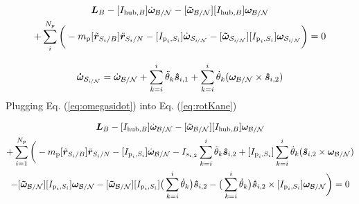 \documentclass[paper]{aiaaNew}
\begin{document}
\begin{multline}
\bm L_B -[I_{\text{hub},B}] \dot{\bm\omega}_{\cal B/N}  -[\bm{\tilde{\omega}}_{\cal B/N}] [I_{\text{hub},B}] \bm\omega_{\cal B/N}\\ + \sum\limits_{i}^{N_p}\bigg(- m_{\text{p}} [\tilde{{\bm r}}_{S_{i}/B}] \ddot{\bm r}_{S_{i}/N} -[I_{\text{p}_i,S_i}] \dot{\bm\omega}_{\cal S_{\textit{i}/N}}  -[\bm{\tilde{\omega}}_{\cal S_{\textit{i}/N}}] [I_{\text{p}_i,S_i}] \bm\omega_{\cal S_{\textit{i}/N}}\bigg) = 0
\label{eq:rotKane}
\end{multline}

\begin{equation}
\bm{\dot{\omega}}_{\cal S_{\textit{i}/N}} = \dot{\bm\omega}_{\cal B/N} + \sum^{i}_{k=i} \ddot{\theta}_k  \bm{\hat{s}}_{i,1} + \sum^{i}_{k=i} \dot{\theta}_k (\bm\omega_{\cal B/N} \times \bm{\hat{s}}_{i,2})
\label{eq:omegasidot}
\end{equation}
Plugging Eq. (\ref{eq:omegasidot}) into Eq. (\ref{eq:rotKane})

\begin{multline}
	\bm L_B -[I_{\text{hub},B}] \dot{\bm\omega}_{\cal B/N}  -[\bm{\tilde{\omega}}_{\cal B/N}] [I_{\text{hub},B}] \bm\omega_{\cal B/N} \\
	+ \sum\limits_{i=1}^{N_p}\bigg(- m_{\text{p}} [\tilde{{\bm r}}_{S_{i}/B}] \ddot{\bm r}_{S_{i}/N} -[I_{\text{p}_i,S_i}] \dot{\bm\omega}_{\cal B/N} - I_{s_{i,2}} \sum^{i}_{k=i} \ddot{\theta}_k \bm{\hat{s}}_{i,2} + [I_{\text{p}_i,S_i}] \sum^{i}_{k=i} \dot{\theta}_k (\bm{\hat{s}}_{i,2} \times \bm\omega_{\cal B/N}) \\-[\bm{\tilde{\omega}}_{\cal B/N}] [I_{\text{p}_i,S_i}] \bm\omega_{\cal B/N}
	- [\bm{\tilde{\omega}}_{\cal B/N}] [I_{\text{p}_i,S_i}] \big(\sum^{i}_{k=i} \dot{\theta}_k \big) \bm{\hat{s}}_{i,2} -  \big(\sum^{i}_{k=i} \dot{\theta}_k \big) \bm{\hat{s}}_{i,2} \times [I_{\text{p}_i,S_i}] \bm\omega_{\cal B/N} \bigg) = 0
\end{multline}
\end{document}

